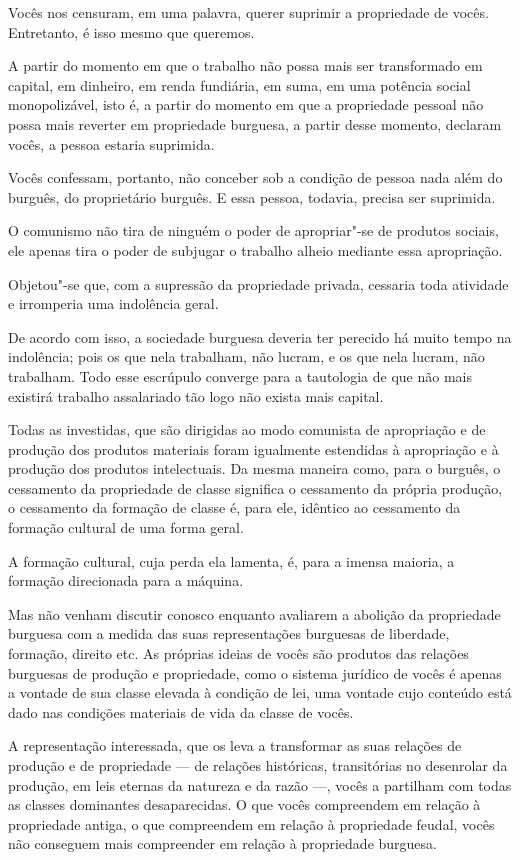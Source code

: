 Vocês nos censuram, em uma palavra, querer suprimir a propriedade de
vocês. Entretanto, é isso mesmo que queremos.

A partir do momento em que o trabalho não possa mais ser transformado em
capital, em dinheiro, em renda fundiária, em suma, em uma potência social
monopolizável, isto é, a partir do momento em que a propriedade pessoal
não possa mais reverter em propriedade burguesa, a partir desse
momento, declaram vocês, a pessoa estaria suprimida.

Vocês confessam, portanto, não conceber sob a condição de pessoa nada
além do burguês, do proprietário burguês. E essa pessoa, todavia,
precisa ser suprimida.

O comunismo não tira de ninguém o poder de apropriar"-se de produtos
sociais, ele apenas tira o poder de subjugar o trabalho alheio mediante
essa apropriação.

Objetou"-se que, com a supressão da propriedade privada, cessaria toda
atividade e irromperia uma indolência geral.

De acordo com isso, a sociedade burguesa deveria ter perecido há muito
tempo na indolência; pois os que nela trabalham, não lucram, e os que
nela lucram, não trabalham. Todo esse escrúpulo converge para a
tautologia de que não mais existirá trabalho assalariado tão logo não
exista mais capital.

Todas as investidas, que são dirigidas ao modo comunista de apropriação
e de produção dos produtos materiais foram igualmente estendidas à
apropriação e à produção dos produtos intelectuais. Da mesma maneira
como, para o burguês, o cessamento da propriedade de classe significa o
cessamento da própria produção, o cessamento da formação de
classe é, para ele, idêntico ao cessamento da formação cultural de uma
forma geral.

A formação cultural, cuja perda ela lamenta, é, para a imensa maioria, a
formação direcionada para a máquina.

Mas não venham discutir conosco enquanto avaliarem a abolição da
propriedade burguesa com a medida das suas representações burguesas de
liberdade, formação, direito etc. As próprias ideias de vocês são
produtos das relações burguesas de produção e propriedade, como o
sistema jurídico de vocês é apenas a vontade de sua classe elevada à
condição de lei, uma vontade cujo conteúdo está dado nas condições
materiais de vida da classe de vocês.

A representação interessada, que os leva a transformar as suas relações
de produção e de propriedade  ---  de relações históricas, transitórias no
desenrolar da produção, em leis eternas da natureza e da razão  ---, vocês
a partilham com todas as classes dominantes desaparecidas. O que vocês
compreendem em relação à propriedade antiga, o que compreendem em
relação à propriedade feudal, vocês não conseguem mais compreender em
relação à propriedade burguesa.

